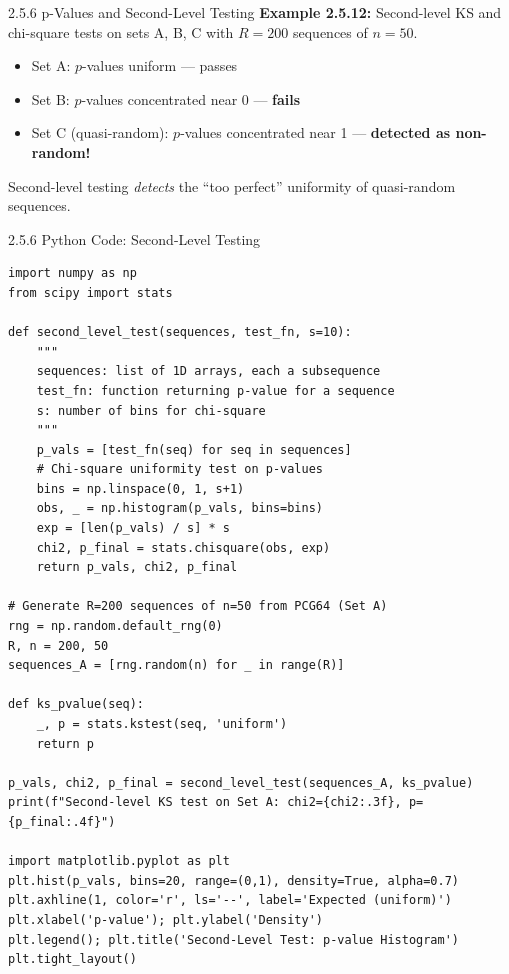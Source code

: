 \documentclass[aspectratio=169,10pt]{beamer}
\begin{document}
\begin{frame}[allowframebreaks]{2.5.6 p-Values and Second-Level Testing}
\medskip
\textbf{Example 2.5.12:} Second-level KS and chi-square tests on sets A, B, C
with $R=200$ sequences of $n=50$.
\begin{itemize}
  \item Set A: $p$-values uniform --- passes
  \item Set B: $p$-values concentrated near 0 --- \textbf{fails}
  \item Set C (quasi-random): $p$-values concentrated near 1 --- \textbf{detected as non-random!}
\end{itemize}

Second-level testing \emph{detects} the ``too perfect'' uniformity of quasi-random sequences.

\end{frame}

\begin{frame}[fragile]{2.5.6 Python Code: Second-Level Testing}

\begin{lstlisting}[style=python]
import numpy as np
from scipy import stats

def second_level_test(sequences, test_fn, s=10):
    """
    sequences: list of 1D arrays, each a subsequence
    test_fn: function returning p-value for a sequence
    s: number of bins for chi-square
    """
    p_vals = [test_fn(seq) for seq in sequences]
    # Chi-square uniformity test on p-values
    bins = np.linspace(0, 1, s+1)
    obs, _ = np.histogram(p_vals, bins=bins)
    exp = [len(p_vals) / s] * s
    chi2, p_final = stats.chisquare(obs, exp)
    return p_vals, chi2, p_final

# Generate R=200 sequences of n=50 from PCG64 (Set A)
rng = np.random.default_rng(0)
R, n = 200, 50
sequences_A = [rng.random(n) for _ in range(R)]

def ks_pvalue(seq):
    _, p = stats.kstest(seq, 'uniform')
    return p

p_vals, chi2, p_final = second_level_test(sequences_A, ks_pvalue)
print(f"Second-level KS test on Set A: chi2={chi2:.3f}, p={p_final:.4f}")

import matplotlib.pyplot as plt
plt.hist(p_vals, bins=20, range=(0,1), density=True, alpha=0.7)
plt.axhline(1, color='r', ls='--', label='Expected (uniform)')
plt.xlabel('p-value'); plt.ylabel('Density')
plt.legend(); plt.title('Second-Level Test: p-value Histogram')
plt.tight_layout()
\end{lstlisting}

\end{frame}
\end{document}
